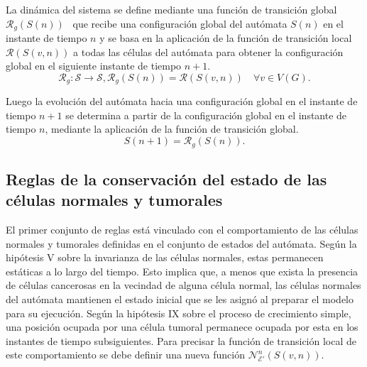 \begin{definition}
\label{def-global-func}
La din\'amica del sistema se define mediante una funci\'on de transici\'on global $\mathcal{R}_g(S(n))$~\cite{book} que recibe una configuraci\'on global del aut\'omata $S(n)$ en el instante de tiempo $n$ y se basa en la aplicaci\'on de la funci\'on de transici\'on local $\mathcal{R}(S(v,n))$ a todas las c\'elulas del aut\'omata para obtener la configuraci\'on global en el siguiente instante de tiempo $n+1$.
\begin{subequations}
\begin{equation}
\mathcal{R}_g:\mathcal{S} \rightarrow \mathcal{S}, \label{eq-global-func}
\end{equation}
\begin{equation}
\mathcal{R}_g(S(n)) = \mathcal{R}(S(v,n)) \quad \forall v \in V(G). \label{eq-global-func-2}
\end{equation}
\end{subequations}
\end{definition}

Luego la evoluci\'on del aut\'omata hacia una configuraci\'on global en el instante de tiempo $n+1$ se determina a partir de la configuraci\'on global en el instante de tiempo $n$, mediante la aplicaci\'on de la funci\'on de transici\'on global.
\begin{equation}
S(n+1) = \mathcal{R}_g(S(n)). \label{eq-global-func-3}
\end{equation}

\subsection{Reglas de la conservaci\'on del estado de las c\'elulas normales y tumorales}
\label{subsec-inert}
El primer conjunto de reglas está vinculado con el comportamiento de las células normales y tumorales definidas en el conjunto de estados del autómata. Según la hipótesis V sobre la invarianza de las células normales, estas permanecen estáticas a lo largo del tiempo. Esto implica que, a menos que exista la presencia de células cancerosas en la vecindad de alguna célula normal, las células normales del autómata mantienen el estado inicial que se les asignó al preparar el modelo para su ejecución. Según la hipótesis IX sobre el proceso de crecimiento simple, una posición ocupada por una célula tumoral permanece ocupada por esta en los instantes de tiempo subsiguientes. Para precisar la funci\'on de transici\'on local de este comportamiento se debe definir una nueva funci\'on $\mathcal{N}_{\mathcal{E'}}^n(S(v,n))$.

